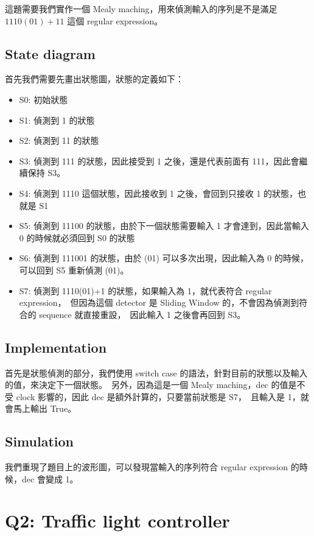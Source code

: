 \documentclass[10.5pt,compsoc,UTF8]{CjC}
\theoremstyle{mystyle}
\begin{document}
這題需要我們實作一個 Mealy maching，用來偵測輸入的序列是不是滿足 $1110(01)+11$ 這個 regular expression。

\subsection{State diagram}

首先我們需要先畫出狀態圖，狀態的定義如下：
\begin{itemize}
  \item S0: 初始狀態
  \item S1: 偵測到 1 的狀態
  \item S2: 偵測到 11 的狀態
  \item S3: 偵測到 111 的狀態，因此接受到 1 之後，還是代表前面有 111，因此會繼續保持 S3。
  \item S4: 偵測到 1110 這個狀態，因此接收到 1 之後，會回到只接收 1 的狀態，也就是 S1
  \item S5: 偵測到 11100 的狀態，由於下一個狀態需要輸入 1 才會達到，因此當輸入 0 的時候就必須回到 S0 的狀態
  \item S6: 偵測到 111001 的狀態，由於 (01) 可以多次出現，因此輸入為 0 的時候，可以回到 S5 重新偵測 (01)。
  \item S7: 偵測到 1110(01)+1 的狀態，如果輸入為 1，就代表符合 regular expression，\
            但因為這個 detector 是 Sliding Window 的，不會因為偵測到符合的 sequence 就直接重設，\
            因此輸入 1 之後會再回到 S3。
\end{itemize}

\subsection{Implementation}
首先是狀態偵測的部分，我們使用 switch case 的語法，針對目前的狀態以及輸入的值，來決定下一個狀態。\
另外，因為這是一個 Mealy maching，dec 的值是不受 clock 影響的，因此 dec 是額外計算的，只要當前狀態是 S7，\
且輸入是 1，就會馬上輸出 True。


\subsection{Simulation}
我們重現了題目上的波形圖，可以發現當輸入的序列符合 regular expression 的時候，dec 會變成 1。

\section{Q2: Traffic light controller}
\end{document}
